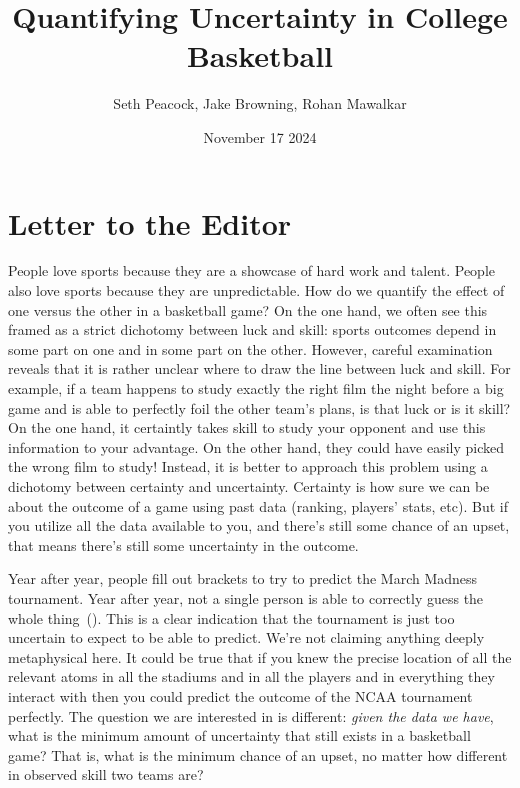 \documentclass{article}
\title{Quantifying Uncertainty in College Basketball}
\author{Seth Peacock, Jake Browning, Rohan Mawalkar}
\date{November 17 2024}
\begin{document}
\maketitle

\newpage

\section{Letter to the Editor}

People love sports because they are a showcase of hard work and talent. People also love sports because they are unpredictable. How do we quantify the effect of one versus the other in a basketball game? On the one hand, we often see this framed as a strict dichotomy between luck and skill: sports outcomes depend in some part on one and in some part on the other. However, careful examination reveals that it is rather unclear where to draw the line between luck and skill. For example, if a team happens to study exactly the right film the night before a big game and is able to perfectly foil the other team's plans, is that luck or is it skill? On the one hand, it certaintly takes skill to study your opponent and use this information to your advantage. On the other hand, they could have easily picked the wrong film to study! Instead, it is better to approach this problem using a dichotomy between certainty and uncertainty. Certainty is how sure we can be about the outcome of a game using past data (ranking, players' stats, etc). But if you utilize all the data available to you, and there's still some chance of an upset, that means there's still some uncertainty in the outcome.

Year after year, people fill out brackets to try to predict the March Madness tournament. Year after year, not a single person is able to correctly guess the whole thing~(\cite{cbsnewsAnyoneEver}). This is a clear indication that the tournament is just too uncertain to expect to be able to predict. We're not claiming anything deeply metaphysical here. It could be true that if you knew the precise location of all the relevant atoms in all the stadiums and in all the players and in everything they interact with then you could predict the outcome of the NCAA tournament perfectly. The question we are interested in is different: \textit{given the data we have}, what is the minimum amount of uncertainty that still exists in a basketball game? That is, what is the minimum chance of an upset, no matter how different in observed skill two teams are?
\end{document}
